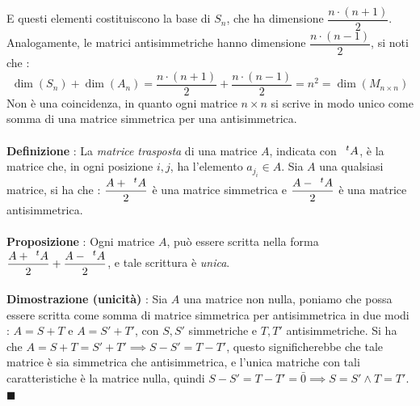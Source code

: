 \documentclass[12pt, letterpaper]{article}
\newcommand{\acc}{\\\hphantom{}\\}
\begin{document}
E questi elementi costituiscono la base di \(S_n\), che ha dimensione \(\dfrac{n\cdot(n+1)}{2}\). Analogamente, 
le matrici antisimmetriche hanno dimensione  \(\dfrac{n\cdot(n-1)}{2}\), si noti che : \begin{equation}
    \dim(S_n)+\dim(A_n)=\dfrac{n\cdot(n+1)}{2}+\dfrac{n\cdot(n-1)}{2}=n^2=\dim(M_{n\times n})
\end{equation}
Non è una coincidenza, in quanto ogni matrice \(n\times n\) si scrive in modo unico come somma di una 
matrice simmetrica per una antisimmetrica.\acc 
\textbf{Definizione }: La \textit{matrice trasposta} di una matrice \(A\), indicata con \(\text{\hphantom{a}}^tA\), è 
la matrice che, in ogni posizione \(i,j\), ha l'elemento \(a_{j_i}\in A\). Sia \(A\) una qualsiasi matrice, 
si ha che : \(\dfrac{A+\text{\hphantom{a}}^tA}{2}\) è una matrice simmetrica e \(\dfrac{A-\text{\hphantom{a}}^tA}{2}\)
è una matrice antisimmetrica.\acc  
\textbf{Proposizione} : Ogni matrice \(A\), può essere scritta nella forma \(\dfrac{A+\text{\hphantom{a}}^tA}{2}+\dfrac{A-\text{\hphantom{a}}^tA}{2}\), e 
tale scrittura è \textit{unica}.\acc 
\textbf{Dimostrazione (unicità)} : Sia \(A\) una matrice non nulla, poniamo che possa essere 
scritta come somma di matrice simmetrica per antisimmetrica in due modi : \(A=S+T\) e \(A=S'+T'\), con 
\(S,S'\) simmetriche e \(T,T'\) antisimmetriche. Si ha che \(A=S+T=S'+T'\implies S-S'=T-T'\), questo significherebbe 
che tale matrice è sia simmetrica  che antisimmetrica, e l'unica matriche con tali caratteristiche è la 
matrice nulla, quindi \(S-S'=T-T'=\bar 0 \implies S=S'\land T=T'\). \(\blacksquare\)  
\end{document}
